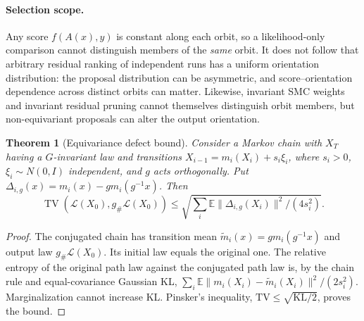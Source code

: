 \documentclass[11pt]{article}
\newtheorem{theorem}{Theorem}
\begin{document}
\paragraph{Selection scope.} Any score $f(A(x),y)$ is constant along each orbit, so a likelihood-only comparison cannot distinguish members of the \emph{same} orbit. It does not follow that arbitrary residual ranking of independent runs has a uniform orientation distribution: the proposal distribution can be asymmetric, and score--orientation dependence across distinct orbits can matter. Likewise, invariant SMC weights and invariant residual pruning cannot themselves distinguish orbit members, but non-equivariant proposals can alter the output orientation.
\begin{theorem}[Equivariance defect bound]
Consider a Markov chain with $X_T$ having a $G$-invariant law and transitions
$X_{i-1}=m_i(X_i)+s_i\xi_i$, where $s_i>0$, $\xi_i\sim N(0,I)$ independent, and $g$ acts orthogonally. Put $\Delta_{i,g}(x)=m_i(x)-g m_i(g^{-1}x)$. Then
\[
\operatorname{TV}(\mathcal L(X_0),g_\#\mathcal L(X_0))
\leq \sqrt{\sum_i\mathbb E\|\Delta_{i,g}(X_i)\|^2/(4s_i^2)}.
\]
\end{theorem}
\begin{proof}
The conjugated chain has transition mean $\widetilde m_i(x)=g m_i(g^{-1}x)$ and output law $g_\#\mathcal L(X_0)$. Its initial law equals the original one. The relative entropy of the original path law against the conjugated path law is, by the chain rule and equal-covariance Gaussian KL,
$\sum_i\mathbb E\|m_i(X_i)-\widetilde m_i(X_i)\|^2/(2s_i^2)$.
Marginalization cannot increase KL. Pinsker's inequality, $\mathrm{TV}\leq\sqrt{\mathrm{KL}/2}$, proves the bound.
\end{proof}
\end{document}
